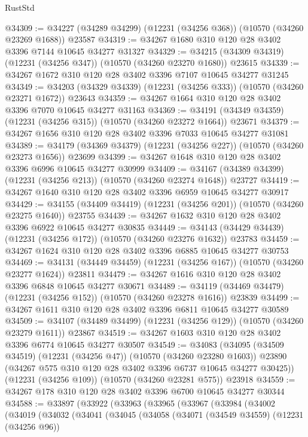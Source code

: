 \begin{lexlean}{RustStd}
\begin{coremodule}
@34309 := @34227 (@34289 @34299) (@12231 (@34256 @368)) (@10570 (@34260 @23269 @1688)) @23587
@34319 := @34267 @1680 @310 @120 @28 @3402 @3396 @7144 @10645 @34277 @31327
@34329 := @34215 (@34309 @34319) (@12231 (@34256 @347)) (@10570 (@34260 @23270 @1680)) @23615
@34339 := @34267 @1672 @310 @120 @28 @3402 @3396 @7107 @10645 @34277 @31245
@34349 := @34203 (@34329 @34339) (@12231 (@34256 @333)) (@10570 (@34260 @23271 @1672)) @23643
@34359 := @34267 @1664 @310 @120 @28 @3402 @3396 @7070 @10645 @34277 @31163
@34369 := @34191 (@34349 @34359) (@12231 (@34256 @315)) (@10570 (@34260 @23272 @1664)) @23671
@34379 := @34267 @1656 @310 @120 @28 @3402 @3396 @7033 @10645 @34277 @31081
@34389 := @34179 (@34369 @34379) (@12231 (@34256 @227)) (@10570 (@34260 @23273 @1656)) @23699
@34399 := @34267 @1648 @310 @120 @28 @3402 @3396 @6996 @10645 @34277 @30999
@34409 := @34167 (@34389 @34399) (@12231 (@34256 @213)) (@10570 (@34260 @23274 @1648)) @23727
@34419 := @34267 @1640 @310 @120 @28 @3402 @3396 @6959 @10645 @34277 @30917
@34429 := @34155 (@34409 @34419) (@12231 (@34256 @201)) (@10570 (@34260 @23275 @1640)) @23755
@34439 := @34267 @1632 @310 @120 @28 @3402 @3396 @6922 @10645 @34277 @30835
@34449 := @34143 (@34429 @34439) (@12231 (@34256 @172)) (@10570 (@34260 @23276 @1632)) @23783
@34459 := @34267 @1624 @310 @120 @28 @3402 @3396 @6885 @10645 @34277 @30753
@34469 := @34131 (@34449 @34459) (@12231 (@34256 @167)) (@10570 (@34260 @23277 @1624)) @23811
@34479 := @34267 @1616 @310 @120 @28 @3402 @3396 @6848 @10645 @34277 @30671
@34489 := @34119 (@34469 @34479) (@12231 (@34256 @152)) (@10570 (@34260 @23278 @1616)) @23839
@34499 := @34267 @1611 @310 @120 @28 @3402 @3396 @6811 @10645 @34277 @30589
@34509 := @34107 (@34489 @34499) (@12231 (@34256 @129)) (@10570 (@34260 @23279 @1611)) @23867
@34519 := @34267 @1603 @310 @120 @28 @3402 @3396 @6774 @10645 @34277 @30507
@34549 := @34083
    (@34095
      (@34509 @34519)
      (@12231 (@34256 @47))
      (@10570 (@34260 @23280 @1603))
      @23890
      (@34267 @575 @310 @120 @28 @3402 @3396 @6737 @10645 @34277 @30425))
    (@12231 (@34256 @109))
    (@10570 (@34260 @23281 @575))
    @23918
@34559 := @34267 @178 @310 @120 @28 @3402 @3396 @6700 @10645 @34277 @30344
@34588 := @33897
    (@33922
      (@33963
        (@33965
          (@33967
            (@33984
              (@34002
                (@34019
                  (@34032
                    (@34041
                      (@34045
                        (@34058
                          (@34071
                            (@34549 @34559)
                            (@12231 (@34256 @96))

\end{coremodule}
\end{lexlean}
